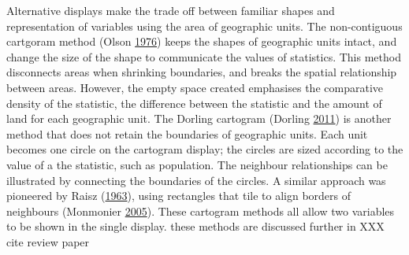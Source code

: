 \documentclass[conference,final,]{IEEEtran}
\begin{document}
Alternative displays make the trade off between familiar shapes and representation of variables using the area of geographic units. The non-contiguous cartgoram method (Olson \protect\hyperlink{ref-NAC}{1976}) keeps the shapes of geographic units intact, and change the size of the shape to communicate the values of statistics. This method disconnects areas when shrinking boundaries, and breaks the spatial relationship between areas. However, the empty space created emphasises the comparative density of the statistic, the difference between the statistic and the amount of land for each geographic unit.
The Dorling cartogram (Dorling \protect\hyperlink{ref-ACTUC}{2011}) is another method that does not retain the boundaries of geographic units. Each unit becomes one circle on the cartogram display; the circles are sized according to the value of a the statistic, such as population. The neighbour relationships can be illustrated by connecting the boundaries of the circles. A similar approach was pioneered by Raisz (\protect\hyperlink{ref-RSCW}{1963}), using rectangles that tile to align borders of neighbours (Monmonier \protect\hyperlink{ref-CDWCS}{2005}).
These cartogram methods all allow two variables to be shown in the single display. these methods are discussed further in XXX cite review paper
\end{document}
